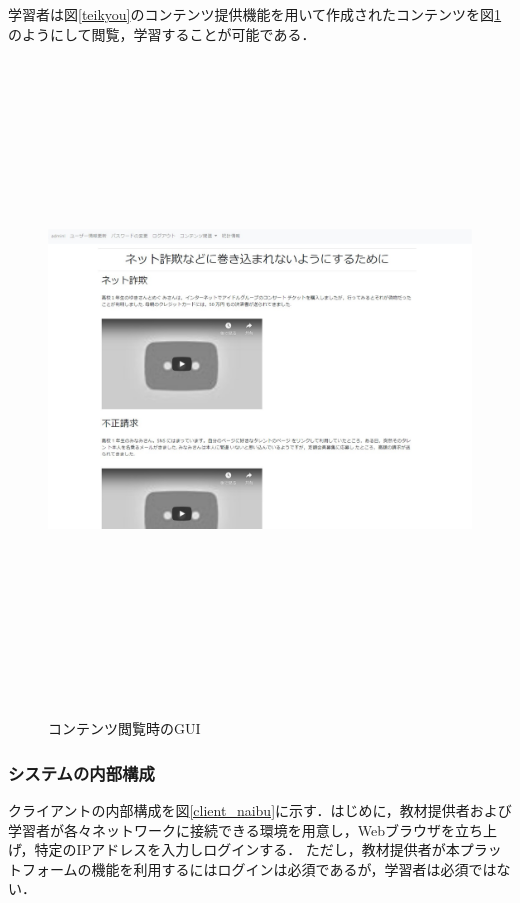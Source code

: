 \newpage
学習者は図\ref{teikyou}のコンテンツ提供機能を用いて作成されたコンテンツを図\ref{naiyou}のようにして閲覧，学習することが可能である．
\begin{figure}[htbp]
    \begin{center}
        \includegraphics[width=18cm,height=17cm,keepaspectratio]{naiyou-crop.pdf}\\
    \end{center}
    \caption{コンテンツ閲覧時のGUI}
    \label{naiyou}
\end{figure}

\newpage
\subsubsection{システムの内部構成}
クライアントの内部構成を図\ref{client_naibu}に示す．はじめに，教材提供者および学習者が各々ネットワークに接続できる環境を用意し，Webブラウザを立ち上げ，特定のIPアドレスを入力しログインする．
ただし，教材提供者が本プラットフォームの機能を利用するにはログインは必須であるが，学習者は必須ではない．

